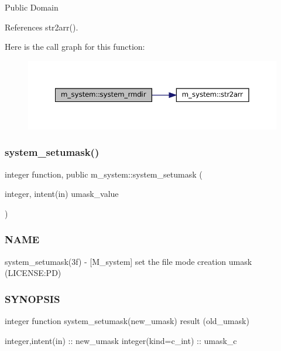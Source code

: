 Public Domain 

References str2arr().

Here is the call graph for this function\+:
\nopagebreak
\begin{figure}[H]
\begin{center}
\leavevmode
\includegraphics[width=350pt]{namespacem__system_a21fd3e1ccd50cef6adc539ef3d7a9836_cgraph}
\end{center}
\end{figure}
\mbox{\label{namespacem__system_a04fd02e6f5ce2f8ecdfb577e1490feba}} 
\subsubsection{\texorpdfstring{system\+\_\+setumask()}{system\_setumask()}}
{\footnotesize\ttfamily integer function, public m\+\_\+system\+::system\+\_\+setumask (\begin{DoxyParamCaption}\item[{integer, intent(in)}]{umask\+\_\+value }\end{DoxyParamCaption})}



\subsubsection*{N\+A\+ME}

system\+\_\+setumask(3f) -\/ \mbox{[}M\+\_\+system\mbox{]} set the file mode creation umask (L\+I\+C\+E\+N\+SE\+:PD) \subsubsection*{S\+Y\+N\+O\+P\+S\+IS}

integer function system\+\_\+setumask(new\+\_\+umask) result (old\+\_\+umask)

integer,intent(in) \+:\+: new\+\_\+umask integer(kind=c\+\_\+int) \+:\+: umask\+\_\+c

